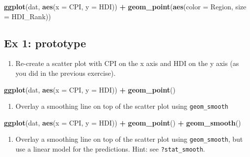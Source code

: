 \documentclass[]{book}
\newenvironment{Shaded}{\begin{snugshade}}{\end{snugshade}}
\newcommand{\KeywordTok}[1]{\textcolor[rgb]{0.13,0.29,0.53}{\textbf{#1}}}
\newcommand{\DataTypeTok}[1]{\textcolor[rgb]{0.13,0.29,0.53}{#1}}
\newcommand{\StringTok}[1]{\textcolor[rgb]{0.31,0.60,0.02}{#1}}
\newcommand{\OperatorTok}[1]{\textcolor[rgb]{0.81,0.36,0.00}{\textbf{#1}}}
\newcommand{\NormalTok}[1]{#1}
\providecommand{\tightlist}{%
  \setlength{\itemsep}{0pt}\setlength{\parskip}{0pt}}
\begin{document}
\begin{Shaded}
\begin{Highlighting}[]
\KeywordTok{ggplot}\NormalTok{(dat, }\KeywordTok{aes}\NormalTok{(}\DataTypeTok{x =}\NormalTok{ CPI, }\DataTypeTok{y =}\NormalTok{ HDI)) }\OperatorTok{+}
\KeywordTok{geom_point}\NormalTok{(}\KeywordTok{aes}\NormalTok{(}\DataTypeTok{color =}\NormalTok{ Region, }\DataTypeTok{size =}\NormalTok{  HDI_Rank))}
\end{Highlighting}
\end{Shaded}

\subsection{Ex 1: prototype}\label{ex-1-prototype-2}

\begin{enumerate}
\def\labelenumi{\arabic{enumi}.}
\tightlist
\item
  Re-create a scatter plot with CPI on the x axis and HDI on the y axis
  (as you did in the previous exercise).
\end{enumerate}

\begin{Shaded}
\begin{Highlighting}[]
\KeywordTok{ggplot}\NormalTok{(dat, }\KeywordTok{aes}\NormalTok{(}\DataTypeTok{x =}\NormalTok{ CPI, }\DataTypeTok{y =}\NormalTok{ HDI)) }\OperatorTok{+}
\StringTok{  }\KeywordTok{geom_point}\NormalTok{()}
\end{Highlighting}
\end{Shaded}

\begin{enumerate}
\def\labelenumi{\arabic{enumi}.}
\setcounter{enumi}{1}
\tightlist
\item
  Overlay a smoothing line on top of the scatter plot using
  \texttt{geom\_smooth}
\end{enumerate}

\begin{Shaded}
\begin{Highlighting}[]
\KeywordTok{ggplot}\NormalTok{(dat, }\KeywordTok{aes}\NormalTok{(}\DataTypeTok{x =}\NormalTok{ CPI, }\DataTypeTok{y =}\NormalTok{ HDI)) }\OperatorTok{+}
\StringTok{  }\KeywordTok{geom_point}\NormalTok{() }\OperatorTok{+}
\StringTok{  }\KeywordTok{geom_smooth}\NormalTok{()}
\end{Highlighting}
\end{Shaded}

\begin{enumerate}
\def\labelenumi{\arabic{enumi}.}
\setcounter{enumi}{2}
\tightlist
\item
  Overlay a smoothing line on top of the scatter plot using
  \texttt{geom\_smooth}, but use a linear model for the predictions.
  Hint: see \texttt{?stat\_smooth}.
\end{enumerate}
\end{document}
